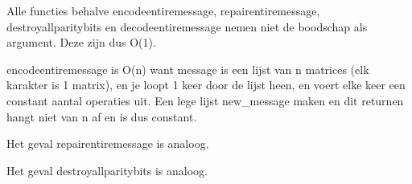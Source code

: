 \documentclass[a4paper]{article}
\begin{document}
Alle functies behalve encodeentiremessage, repairentiremessage, destroyallparitybits en decodeentiremessage nemen niet de
boodschap als argument. Deze zijn dus O(1).

encodeentiremessage is O(n) want message is een lijst van n matrices (elk karakter is 1 matrix), en je loopt 1 keer door de lijst heen, en voert elke keer een constant aantal operaties uit. Een lege lijst new\_message maken en dit returnen hangt niet van n af en is dus constant.

Het geval repairentiremessage is analoog.

Het geval destroyallparitybits is analoog.
\end{document}
